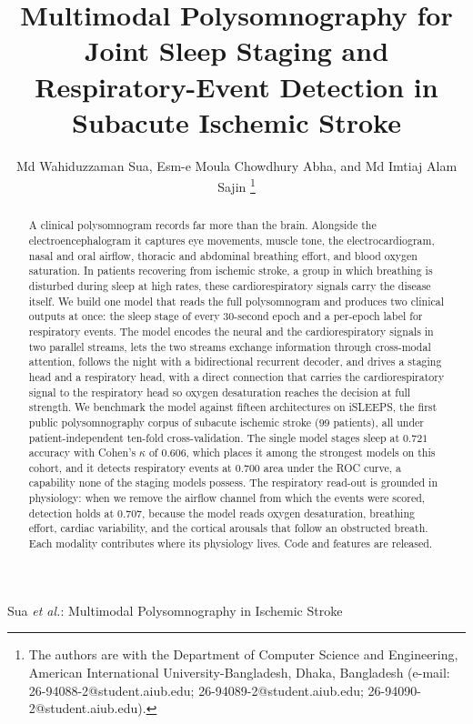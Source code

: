 \documentclass[journal]{IEEEtran}
\newcommand{\mmAcc}{0.721}
\newcommand{\mmK}{0.606}
\newcommand{\mmAuc}{0.700}
\newcommand{\noflowAuc}{0.707}
\begin{document}
\title{Multimodal Polysomnography for Joint Sleep Staging and Respiratory-Event Detection in Subacute Ischemic Stroke}

\author{Md Wahiduzzaman Sua, Esm-e Moula Chowdhury Abha, and Md Imtiaj Alam Sajin%
\thanks{The authors are with the Department of Computer Science and Engineering,
American International University-Bangladesh, Dhaka, Bangladesh
(e-mail: 26-94088-2@student.aiub.edu; 26-94089-2@student.aiub.edu;
26-94090-2@student.aiub.edu).}}

%
{Sua \MakeLowercase{\textit{et al.}}: Multimodal Polysomnography in Ischemic Stroke}

\maketitle

\begin{abstract}
A clinical polysomnogram records far more than the brain. Alongside the
electroencephalogram it captures eye movements, muscle tone, the electrocardiogram,
nasal and oral airflow, thoracic and abdominal breathing effort, and blood oxygen
saturation. In patients recovering from ischemic stroke, a group in which breathing is
disturbed during sleep at high rates, these cardiorespiratory signals carry the disease
itself. We build one model that reads the full polysomnogram and produces two clinical
outputs at once: the sleep stage of every 30-second epoch and a per-epoch label for
respiratory events. The model encodes the neural and the cardiorespiratory signals in two
parallel streams, lets the two streams exchange information through cross-modal attention,
follows the night with a bidirectional recurrent decoder, and drives a staging head and a
respiratory head, with a direct connection that carries the cardiorespiratory signal to the
respiratory head so oxygen desaturation reaches the decision at full strength. We benchmark
the model against fifteen architectures on iSLEEPS, the first public polysomnography corpus
of subacute ischemic stroke (99 patients), all under patient-independent ten-fold
cross-validation. The single model stages sleep at $\mmAcc$ accuracy with Cohen's $\kappa$
of $\mmK$, which places it among the strongest models on this cohort, and it detects
respiratory events at $\mmAuc$ area under the ROC curve, a capability none of the staging
models possess. The respiratory read-out is grounded in physiology: when we remove the
airflow channel from which the events were scored, detection holds at $\noflowAuc$, because
the model reads oxygen desaturation, breathing effort, cardiac variability, and the cortical
arousals that follow an obstructed breath. Each modality contributes where its physiology
lives. Code and features are released.
\end{abstract}
\end{document}
